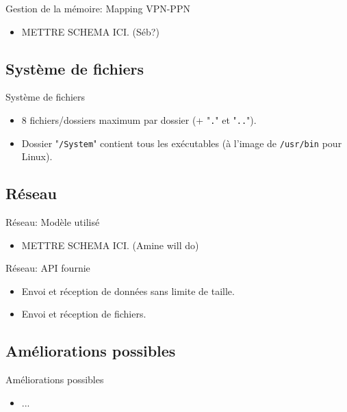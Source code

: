 \documentclass{beamer}
\begin{document}
\begin{frame}{Gestion de la mémoire: Mapping VPN-PPN}
	\begin{itemize}
		\item METTRE SCHEMA ICI. (Séb?)
    \end{itemize}
\end{frame}

\subsection{Système de fichiers}
\begin{frame}{Système de fichiers}
    \begin{itemize}
		\item 8 fichiers/dossiers maximum par dossier (+ "\texttt{.}" et "\texttt{..}").
		\item Dossier "\texttt{/System}" contient tous les exécutables (à l'image de \texttt{/usr/bin} pour Linux).
    \end{itemize}
\end{frame}

\subsection{Réseau}

\begin{frame}{Réseau: Modèle utilisé}
    \begin{itemize}
        \item METTRE SCHEMA ICI. (Amine will do)
    \end{itemize}
\end{frame}

\begin{frame}{Réseau: API fournie}
    \begin{itemize}
        \item Envoi et réception de données sans limite de taille.
        \item Envoi et réception de fichiers.
    \end{itemize}
\end{frame}

\subsection{Améliorations possibles}
\begin{frame}{Améliorations possibles}
    \begin{itemize}
        \item ...
    \end{itemize}
\end{frame}
\end{document}
